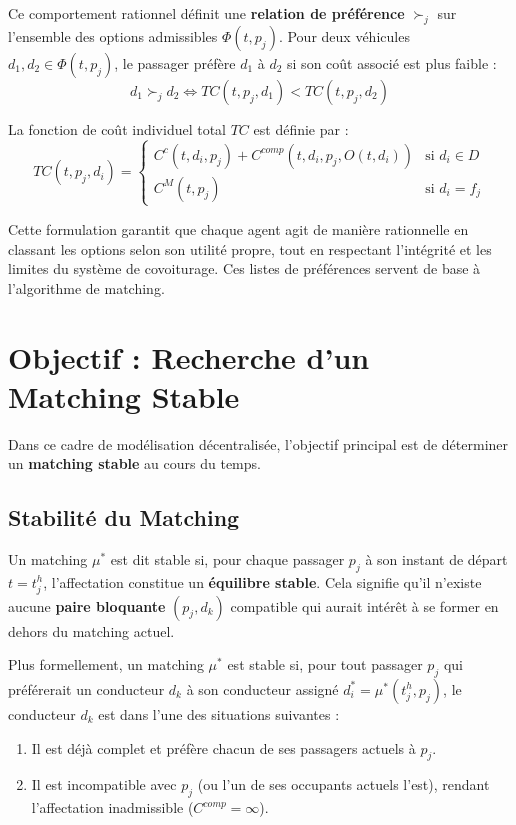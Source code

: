 \documentclass[12pt, a4paper]{article}
\begin{document}
Ce comportement rationnel définit une \textbf{relation de préférence} $\succ_j$ sur l'ensemble des options admissibles $\Phi(t, p_j)$. Pour deux véhicules $d_1, d_2 \in \Phi(t, p_j)$, le passager préfère $d_1$ à $d_2$ si son coût associé est plus faible :
$$ d_1 \succ_j d_2 \iff TC(t, p_j, d_1) < TC(t, p_j, d_2) $$

La fonction de coût individuel total $TC$ est définie par :
$$ TC(t, p_j, d_i) = \begin{cases}
    C^c(t, d_i, p_j) + C^{comp}(t, d_i, p_j, O(t, d_i)) & \text{si } d_i \in D \\
    C^M(t, p_j) & \text{si } d_i = f_j
\end{cases} $$

Cette formulation garantit que chaque agent agit de manière rationnelle en classant les options selon son utilité propre, tout en respectant l'intégrité et les limites du système de covoiturage. Ces listes de préférences servent de base à l'algorithme de matching.

\section{Objectif : Recherche d'un Matching Stable}
Dans ce cadre de modélisation décentralisée, l'objectif principal est de déterminer un \textbf{matching stable} au cours du temps.

\subsection{Stabilité du Matching}
Un matching $\mu^*$ est dit stable si, pour chaque passager $p_j$ à son instant de départ $t = t^h_j$, l'affectation constitue un \textbf{équilibre stable}. Cela signifie qu'il n'existe aucune \textbf{paire bloquante} $(p_j, d_k)$ compatible qui aurait intérêt à se former en dehors du matching actuel.

Plus formellement, un matching $\mu^*$ est stable si, pour tout passager $p_j$ qui préférerait un conducteur $d_k$ à son conducteur assigné $d_i^* = \mu^*(t^h_j, p_j)$, le conducteur $d_k$ est dans l'une des situations suivantes :
\begin{enumerate}
    \item Il est déjà complet et préfère chacun de ses passagers actuels à $p_j$.
    \item Il est incompatible avec $p_j$ (ou l'un de ses occupants actuels l'est), rendant l'affectation inadmissible ($C^{comp} = \infty$).
\end{enumerate}
\end{document}
